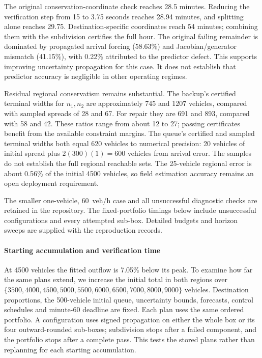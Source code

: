 The original conservation-coordinate check reaches 28.5 minutes. Reducing
the verification step from 15 to 3.75 seconds reaches 28.94 minutes, and splitting
alone reaches 29.75. Destination-specific coordinates reach 54 minutes;
combining them with the subdivision certifies the full hour. The original
failing remainder is dominated by propagated arrival forcing (58.63\%)
and Jacobian/generator mismatch (41.15\%), with 0.22\% attributed to the
predictor defect. This supports improving uncertainty propagation for this
case. It does not establish that predictor accuracy is negligible in other
operating regimes.

Residual regional conservatism remains substantial. The backup's certified
terminal widths for $n_1,n_2$ are approximately 745 and 1207 vehicles,
compared with sampled spreads of 28 and 67. For repair they are 691 and
893, compared with 58 and 42. These ratios range from about 12 to 27;
passing certificates benefit from the available constraint margins.
The queue's certified and sampled terminal widths both equal 620 vehicles
to numerical precision: 20 vehicles of initial spread plus
$2(300)(1)=600$ vehicles from arrival error. The samples do not establish
the full regional reachable sets. The 25-vehicle regional error is about
0.56\% of the initial 4500 vehicles, so field estimation accuracy remains
an open deployment requirement.

The smaller one-vehicle, 60~veh/h case and all unsuccessful diagnostic
checks are retained in the repository. The fixed-portfolio timings below include unsuccessful configurations
and every attempted sub-box. Detailed budgets and horizon sweeps are
supplied with the reproduction records.

\paragraph{Starting accumulation and verification time}
At 4500 vehicles the fitted outflow is 7.05\% below its peak. To examine
how far the same plans extend, we increase the initial total in both
regions over $\{3500,4000,4500,5000,5500,6000,6500,7000,8000,9000\}$
vehicles. Destination proportions, the 500-vehicle initial queue, uncertainty
bounds, forecasts, control schedules and minute-60 deadline are fixed.
Each plan uses the same ordered portfolio. A configuration uses signed
propagation on either the whole box or its four outward-rounded sub-boxes;
subdivision stops after a failed component, and the portfolio stops after
a complete pass. This tests the stored plans rather than replanning for
each starting accumulation.

